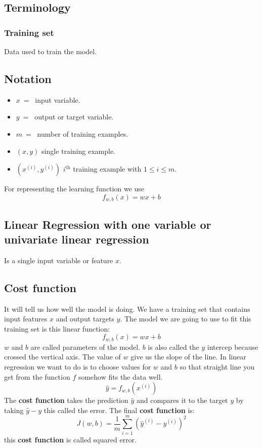\documentclass[a4paper]{article}
\begin{document}
\subsection{Terminology}
\subsubsection{Training set}
\noindent
Data used to train the model.
\subsection{Notation}
\noindent
\begin{itemize}
    \item \(x \ = \ \) input variable.
    \item \(y \ = \ \) output or target variable. 
    \item \(m \ = \ \) number of training examples.
    \item \((x, y)\) single training example.
    \item \((x^{(i)}, y^{(i)})\) \(i^{\text{th}}\) training example with \(1 \leq i \leq m\). 
\end{itemize}
For representing the learning function we use
\[
    f_{w,b}\left(x\right) = wx + b  
\]
\subsection{Linear Regression with one variable or univariate linear regression}
\noindent
Is a single input variable or feature \(x\).
\subsection{Cost function}
\noindent
It will tell us how well the model is doing. We have a training set that contains input 
features \(x\) and output targets \(y\). The model we are going to use to fit this training set
is this linear function:
\[
    f_{w,b}\left(x\right) = wx + b  
\]
\(w\) and \(b\) are called parameters of the model.
\newline 
\(b\) is also called the \(y\) intercep because crossed the vertical axis. The value of \(w\) give us 
the slope of the line. In linear regression we want to do is to choose values for \(w\) and \(b\) so
that straight line you get from the function \(f\) somehow fits the data well.
\[
    \hat{y} = f_{w,b}\left(x^{(i)}\right)  
\]
The \textbf{cost function} takes the prediction \(\hat{y}\) and compares it to the target \(y\) by
taking \(\hat{y} - y\) this called the error.
\newline
The final \textbf{cost function} is:
\[
    J\left(w, b\right) = \frac{1}{m} \sum_{i = 1}^{m}\left(\hat{y}^{(i)} - y^{(i)}\right)^2  
\]
this \textbf{cost function} is called squared error.
\end{document}
